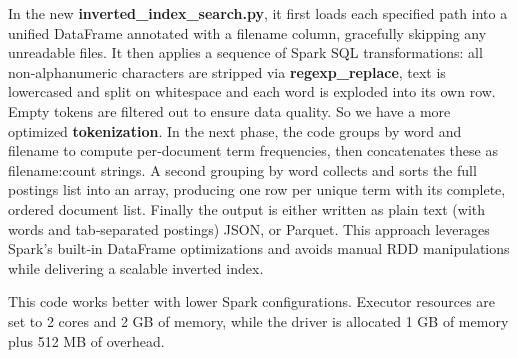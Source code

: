 \vspace{4mm}

In the new \textbf{inverted\_index\_search.py}, it first loads each specified path into a unified DataFrame annotated with a filename column, gracefully skipping any unreadable files. It then applies a sequence of Spark SQL transformations: all non‐alphanumeric characters are stripped via \textbf{regexp\_replace}, text is lowercased and split on whitespace and each word is exploded into its own row. Empty tokens are filtered out to ensure data quality. So we have a more optimized \textbf{tokenization}. In the next phase, the code groups by word and filename to compute per‐document term frequencies, then concatenates these as filename:count strings. A second grouping by word collects and sorts the full postings list into an array, producing one row per unique term with its complete, ordered document list. Finally the output is either written as plain text (with words and tab‐separated postings) JSON, or Parquet. This approach leverages Spark’s built‐in DataFrame optimizations and avoids manual RDD manipulations while delivering a scalable inverted index. 

This code works better with lower Spark configurations. Executor resources are set to 2 cores and 2 GB of memory, while the driver is allocated 1 GB of memory plus 512 MB of overhead.  




